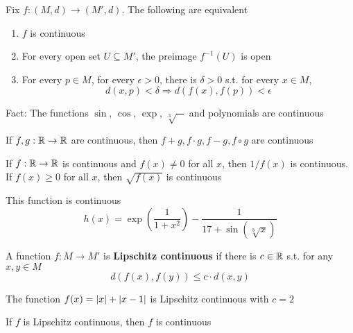 \documentclass[11pt]{article}
\begin{document}
\begin{proposition}[]
Fix \(f:(M,d)\to(M',d)\). The following are equivalent
\begin{enumerate}
\item \(f\) is continuous
\item For every open set \(U\subseteq M'\), the preimage \(f^{-1}(U)\) is open
\item For every \(p\in M\), for every \(\epsilon>0\), there is \(\delta>0\) s.t. for every \(x\in M\),
 \begin{equation*}
d(x,p)<\delta\Rightarrow d(f(x),f(p))<\epsilon
 \end{equation*}
\end{enumerate}
\end{proposition}

Fact: The functions \(\sin\), \(\cos\), \(\exp\), \(\sqrt[3]{-}\) and polynomials are continuous

\begin{proposition}[]
If \(f,g:\mathbb{R}\to\mathbb{R}\) are continuous, then \(f+g,f\cdot g,f-g,f\circ g\) are continuous
\end{proposition}

\begin{proposition}[]
If \(f:\mathbb{R}\to\mathbb{R}\) is continuous and \(f(x)\neq 0\) for all \(x\), then \(1/f(x)\) is continuous.
If \(f(x)\ge 0\) for all \(x\), then \(\sqrt{f(x)}\) is continuous
\end{proposition}

\begin{examplle}[]
This function is continuous
\begin{equation*}
h(x)=\exp\left( \frac{1}{1+x^2} \right)-\frac{1}{17+\sin(\sqrt[3]{x})}
\end{equation*}
\end{examplle}

\begin{definition}[]
A function \(f:M\to M'\) is \textbf{Lipschitz continuous} if there is \(c\in\mathbb{R}\) s.t. for any \(x,y\in M\)
\begin{equation*}
d(f(x),f(y))\le c\cdot d(x,y)
\end{equation*}
\end{definition}

\begin{examplle}[In \(\R\)]
The function \(f(x)=\abs{x}+\abs{x-1}\) is Lipschitz continuous with \(c=2\)
\end{examplle}

\begin{proposition}[]
If \(f\) is Lipschitz continuous, then \(f\) is continuous
\end{proposition}
\end{document}
